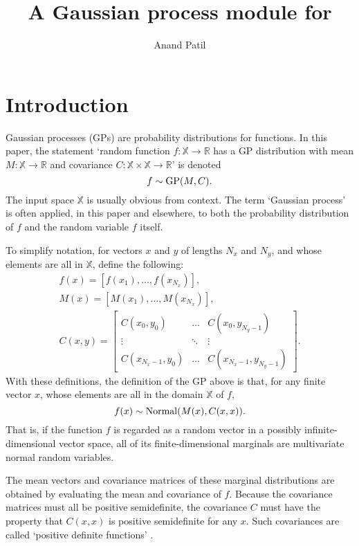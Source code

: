 \documentclass[article]{jss}
\author{Anand Patil}
\title{A Gaussian process module for \pkg{PyMC}}
\begin{document}
\maketitle

\tableofcontents


\section{Introduction}\label{sec:firstlook}

Gaussian processes (GPs) are probability distributions for functions. In this paper, the statement `random function $f:\mathbb X\rightarrow \mathbb R$ has a GP distribution with mean $M:\mathbb X\rightarrow \mathbb R$ and covariance $C:\mathbb X\times \mathbb X\rightarrow \mathbb R$' is denoted
\begin{equation}
    f\sim\textup{GP}(M,C).
\end{equation}
The input space $\mathbb X$ is usually obvious from context. The term `Gaussian process' is often applied, in this paper and elsewhere, to both the probability distribution of $f$ and the random variable $f$ itself.

To simplify notation, for vectors $x$ and $y$ of lengths $N_x$ and $N_y$, and whose elements are all in $\mathbb X$, define the following:
\begin{eqnarray*}
    f(x) = \left[f(x_1),\ldots,f(x_{N_x})\right],\\
    M(x) = \left[M(x_1),\ldots,M(x_{N_x})\right],\\
    C(x,y) = \left[\begin{array}{ccc}
        C(x_0,y_0)& \ldots& C(x_0,y_{N_y-1})\\
        \vdots&\ddots&\vdots\\
        C(x_{N_x-1},y_0)& \ldots& C(x_{N_x-1},y_{N_y-1})
    \end{array}\right].
\end{eqnarray*}
With these definitions, the definition of the GP above \citep{banerjee} is that, for any finite vector $x$, whose elements are all in the domain $\mathbb X$ of $f$,
\begin{equation}
    f(x)\sim\textup{Normal}(M(x),C(x,x)).
\end{equation}
That is, if the function $f$ is regarded as a random vector in a possibly infinite-dimensional vector space, all of its finite-dimensional marginals are multivariate normal random variables. 

The mean vectors and covariance matrices of these marginal distributions are obtained by evaluating the mean and covariance of $f$. Because the covariance matrices must all be positive semidefinite, the covariance $C$ must have the property that $C(x,x)$ is positive semidefinite for any $x$. Such covariances are called `positive definite functions' \citep{diggle}. 
\end{document}
